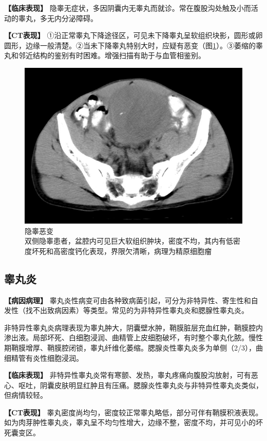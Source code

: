 \textbf{【临床表现】}
隐睾无症状，多因阴囊内无睾丸而就诊。常在腹股沟处触及小而活动的睾丸，多无内分泌障碍。

\textbf{【CT表现】}
①沿正常睾丸下降途径区，可见未下降睾丸呈软组织块影，圆形或卵圆形，边缘一般清楚。②当未下降睾丸特别大时，应疑有恶变（图\ref{fig21-5}）。③萎缩的睾丸和邻近结构的鉴别有时困难。增强扫描有助于与血管相鉴别。

\begin{figure}[!htbp]
 \centering
 \includegraphics[width=.7\textwidth,height=\textheight,keepaspectratio]{./images/Image00401.jpg}
 \captionsetup{justification=centering}
 \caption{隐睾恶变\\{\small 双侧隐睾患者，盆腔内可见巨大软组织肿块，密度不均，其内有低密度坏死和高密度钙化表现，界限欠清晰，病理为精原细胞瘤}}
 \label{fig21-5}
  \end{figure} 

\subsection{睾丸炎}

\textbf{【病因病理】}
睾丸炎性病变可由各种致病菌引起，可分为非特异性、寄生性和自发性（找不出致病因素）等类型。常见的为非特异性睾丸炎和腮腺性睾丸炎。

非特异性睾丸炎病理表现为睾丸肿大，阴囊壁水肿，鞘膜脏层充血红肿，鞘膜腔内渗出液。局部坏死、白细胞浸润、曲精管上皮细胞破坏，有时整个睾丸化脓。慢性期鞘膜增厚、鞘膜腔闭锁，睾丸纤维化萎缩。腮腺炎性睾丸炎多为单侧（2/3），曲细精管有炎性细胞浸润。

\textbf{【临床表现】}
非特异性睾丸炎常有寒颤、发热，睾丸疼痛向腹股沟放射，可有恶心、呕吐，阴囊皮肤明显红肿且有压痛。腮腺炎性睾丸炎与非特异性睾丸炎类似，但病情较轻。

\textbf{【CT表现】}
睾丸密度尚均匀，密度较正常睾丸略低，部分可伴有鞘膜积液表现。如为肉芽肿性睾丸炎，睾丸呈不均匀性增大，边缘不整，密度不均，并可见小的坏死囊变区。

